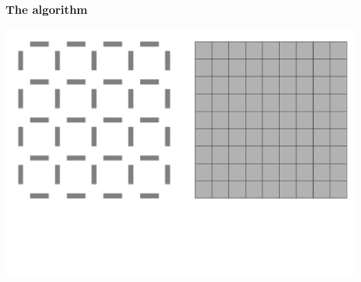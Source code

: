 \documentclass{beamer}
\begin{document}
\begin{frame}
    \frametitle{The algorithm}
    \begin{center}
        \includegraphics[width=\textwidth]{img/grid0.png}
    \end{center}
\end{frame}
\end{document}
